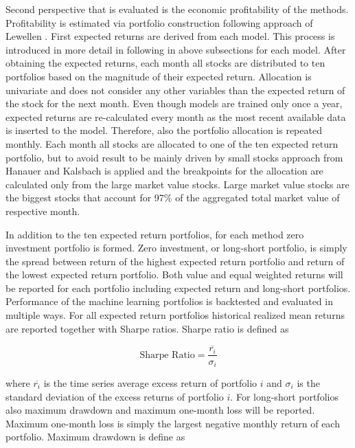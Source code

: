 \documentclass{article}
\begin{document}
Second perspective that is evaluated is the economic profitability of the methods. Profitability is estimated via portfolio construction following approach of Lewellen \citeyear{Lewellen2015}. First expected returns are derived from each model. This process is introduced in more detail in following in above subsections for each model. After obtaining the expected returns, each month all stocks are distributed to ten portfolios based on the magnitude of their expected return. Allocation is univariate and does not consider any other variables than the expected return of the stock for the next month. Even though models are trained only once a year, expected returns are re-calculated every month as the most recent available data is inserted to the model. Therefore, also the portfolio allocation is repeated monthly. Each month all stocks are allocated to one of the ten expected return portfolio, but to avoid result to be mainly driven by small stocks approach from Hanauer and Kalsbach is applied \citeyear{HANAUER2023} and the breakpoints for the allocation are calculated only from the large market value stocks. Large market value stocks are the biggest stocks that account for 97\% of the aggregated total market value of respective month. \par

In addition to the ten expected return portfolios, for each method zero investment portfolio is formed. Zero investment, or long-short portfolio, is simply the spread between return of the highest expected return portfolio and return of the lowest expected return portfolio. Both value and equal weighted returns will be reported for each portfolio including expected return and long-short portfolios. Performance of the machine learning portfolios is backtested and evaluated in multiple ways. For all expected return portfolios historical realized mean returns are reported together with Sharpe ratios. Sharpe ratio is defined as

\begin{equation}
\label{eq:SharpeRatio}
\text{Sharpe Ratio} = \frac{\overline{r_i}}{\sigma_i}
\end{equation}

where $\overline{r_i}$ is the time series average excess return of portfolio $i$ and $\sigma_i$ is the standard deviation of the excess returns of portfolio $i$. For long-short portfolios also maximum drawdown and maximum one-month loss will be reported. Maximum one-month loss is simply the largest negative monthly return of each portfolio. Maximum drawdown is define as \par
\end{document}
